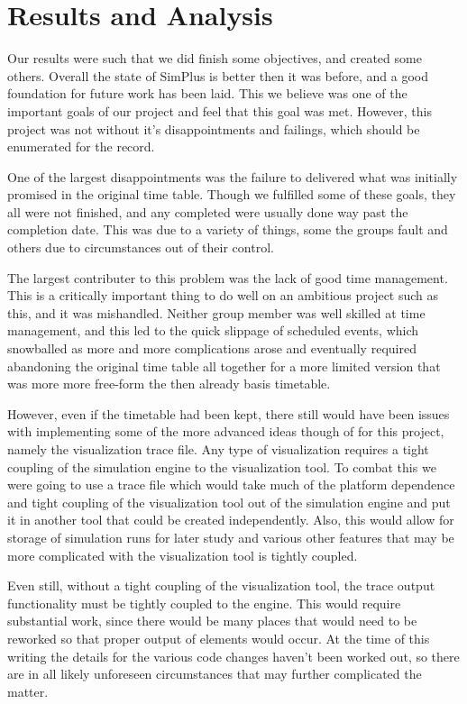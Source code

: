 \documentclass[12pt]{report}
\newcommand{\mychapter}[1]{\chapter{#1} \label{ch:#1} \thispagestyle{fancy}}
\begin{document}
\mychapter{Results and Analysis}
	Our results were such that we did finish some objectives, and created some others.  Overall the state of SimPlus is better then it was before, and a good foundation for future work has been laid.  This we believe was one of the important goals of our project and feel that this goal was met.  However, this project was not without it's disappointments and failings, which should be enumerated for the record.

	One of the largest disappointments was the failure to delivered what was initially promised in the original time table.  Though we fulfilled some of these goals, they all were not finished, and any completed were usually done way past the completion date.  This was due to a variety of things, some the groups fault and others due to circumstances out of their control.

	The largest contributer to this problem was the lack of good time management.  This is a critically important thing to do well on an ambitious project such as this, and it was mishandled.  Neither group member was well skilled at time management, and this led to the quick slippage of scheduled events, which snowballed as more and more complications arose and eventually required abandoning the original time table all together for a more limited version that was more more free-form the then already basis timetable.

	However, even if the timetable had been kept, there still would have been issues with implementing some of the more advanced ideas though of for this project, namely the visualization trace file.  Any type of visualization requires a tight coupling of the simulation engine to the visualization tool.  To combat this we were going to use a trace file which would take much of the platform dependence and tight coupling of the visualization tool out of the simulation engine and put it in another tool that could be created independently.  Also, this would allow for storage of simulation runs for later study and various other features that may be more complicated with the visualization tool is tightly coupled.

	Even still, without a tight coupling of the visualization tool, the trace output functionality must be tightly coupled to the engine.  This would require substantial work, since there would be many places that would need to be reworked so that proper output of elements would occur.  At the time of this writing the details for the various code changes haven't been worked out, so there are in all likely unforeseen circumstances that may further complicated the matter.
\end{document}
